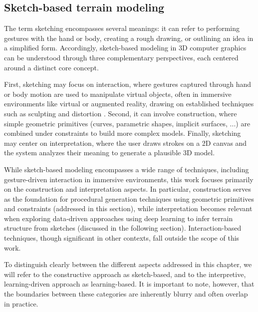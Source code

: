 


\subsection{Sketch-based terrain modeling}
\label{sec:coral-island_sota-sketches}

The term sketching encompasses several meanings: it can refer to performing gestures with the hand or body, creating a rough drawing, or outlining an idea in a simplified form. Accordingly, sketch-based modeling in 3D computer graphics can be understood through three complementary perspectives, each centered around a distinct core concept.

First, sketching may focus on interaction, where gestures captured through hand or body motion are used to manipulate virtual objects, often in immersive environments like virtual or augmented reality, drawing on established techniques such as sculpting and distortion \cite{Olsen2009, Cook2009}. Second, it can involve construction, where simple geometric primitives (curves, parametric shapes, implicit surfaces, ...) are combined under constraints to build more complex models. Finally, sketching may center on interpretation, where the user draws strokes on a 2D canvas and the system analyzes their meaning to generate a plausible 3D model.

While sketch-based modeling encompasses a wide range of techniques, including gesture-driven interaction in immersive environments, this work focuses primarily on the construction and interpretation aspects. In particular, construction serves as the foundation for procedural generation techniques using geometric primitives and constraints (addressed in this section), while interpretation becomes relevant when exploring data-driven approaches using deep learning to infer terrain structure from sketches (discussed in the following section). Interaction-based techniques, though significant in other contexts, fall outside the scope of this work. 

To distinguish clearly between the different aspects addressed in this chapter, we will refer to the constructive approach as sketch-based, and to the interpretive, learning-driven approach as learning-based. It is important to note, however, that the boundaries between these categories are inherently blurry and often overlap in practice.

